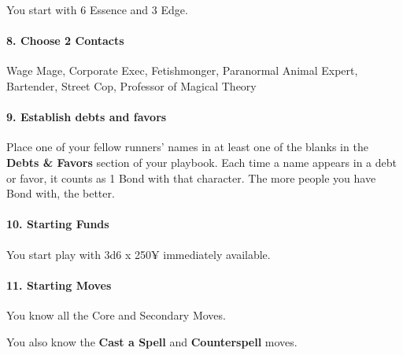 \begin{multicols}{3}
You start with 6 Essence and 3 Edge.

\paragraph{8.  Choose 2 Contacts}

Wage Mage, Corporate Exec, Fetishmonger,
Paranormal Animal Expert, Bartender, Street
Cop, Professor of Magical Theory

\paragraph{9.  Establish debts and favors}

Place one of your fellow runners’ names in at
least one of the blanks in the \textbf{Debts \& Favors}
section of your playbook. Each time a name
appears in a debt or favor, it counts as 1 Bond
with that character. The more people you have
Bond with, the better.

\paragraph{10.  Starting Funds}

You start play with 3d6 x 250¥ immediately
available.

\paragraph{11.  Starting Moves}

You know all the Core and Secondary Moves.

You also know the \textbf{Cast a Spell} and \textbf{Counterspell} moves.

\end{multicols}

\newpage


